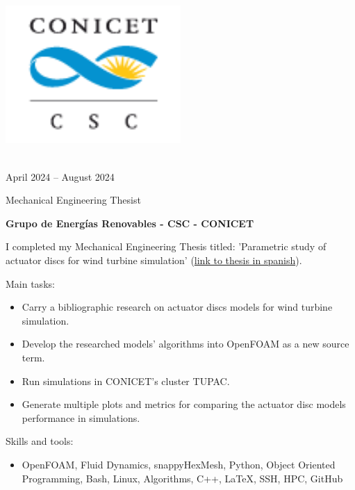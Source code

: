 \documentclass[a4paper,10pt]{article}
\newlength{\cvcolumngapwidth}
\newlength{\cvleftcolumnwidth}
\newlength{\cvrightcolumnwidth}
\newcommand{\cvtitlestyle}[1]{{\large\cvtitlefont\textcolor{cvtitlecolor}{#1}}}
\newcommand{\cvdurationstyle}[1]{{\small\cvdurationfont\textcolor{cvdurationcolor}{#1}}}
\newlength{\cvafteritemskipamount}
\newlength{\cvaftertitleskipamount}
\newlength{\cvparskip}
\newcommand{\cvitem}[2]{
    \begin{minipage}[t]{\cvleftcolumnwidth}
        \raggedleft #1
    \end{minipage}%
    \hspace{\cvcolumngapwidth}%
    \begin{minipage}[t]{\cvrightcolumnwidth}
        \setlength{\parskip}{\cvparskip} #2
    \end{minipage}

    \vspace{\cvafteritemskipamount}
}
\newcommand{\cvtitle}[1]{
    \cvtitlestyle{#1}

    \vspace{\cvaftertitleskipamount}
    \vspace{-\cvparskip}
}
\begin{document}
\cvitem{
	\begin{minipage}{\textwidth}
    \begin{flushright}
		  \includegraphics[width=0.5\textwidth]{../../../../logos-photos/Logo_CSC.png}   
    \end{flushright}  
  \end{minipage} \\
  \vspace{0.3cm}
  \cvdurationstyle{April 2024 -- August 2024}\\
}{
	
  \cvtitle{Mechanical Engineering Thesist}
  \textbf{\large Grupo de Energías Renovables - CSC - CONICET}

  I completed my Mechanical Engineering Thesis titled: 'Parametric study of actuator discs for wind turbine simulation'
  (\href{https://drive.google.com/file/d/1TWklGPKCdaIwJHuOc-fqAFvFS9hN7_sT/view?usp=sharing}{link to thesis in spanish}).

  Main tasks:
  \begin{itemize}
    \item Carry a bibliographic research on actuator discs models for wind turbine simulation.
    \item Develop the researched models' algorithms into OpenFOAM as a new source term.
    \item Run simulations in CONICET's cluster TUPAC.
    \item Generate multiple plots and metrics for comparing the actuator disc models performance in simulations.
  \end{itemize}

  Skills and tools:
  \begin{itemize}
    \item OpenFOAM, Fluid Dynamics, snappyHexMesh, Python, Object Oriented Programming, Bash, Linux, Algorithms,
        C++, LaTeX, SSH, HPC, GitHub
  \end{itemize}
  
}
\end{document}
